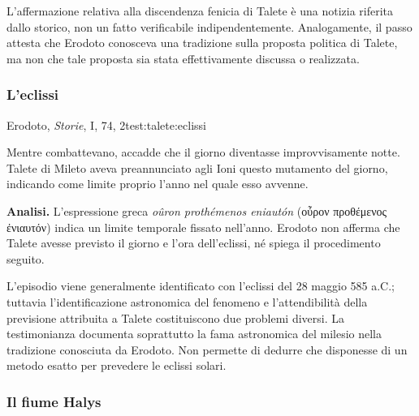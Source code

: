 L'affermazione relativa alla discendenza fenicia di Talete è una notizia riferita dallo storico, non un fatto verificabile indipendentemente. Analogamente, il passo attesta che Erodoto conosceva una tradizione sulla proposta politica di Talete, ma non che tale proposta sia stata effettivamente discussa o realizzata.

\subsubsection{L'eclissi}

\begin{testimonianza}{Erodoto, \emph{Storie}, I, 74, 2}{test:talete:eclissi}
\smallskip
{}\par
Mentre combattevano, accadde che il giorno diventasse improvvisamente notte. Talete di Mileto aveva preannunciato agli Ioni questo mutamento del giorno, indicando come limite proprio l'anno nel quale esso avvenne.
\end{testimonianza}



\noindent\textbf{Analisi.}
L'espressione greca \emph{oûron prothémenos eniautón} (οὖρον προθέμενος ἐνιαυτόν) indica un limite temporale fissato nell'anno. Erodoto non afferma che Talete avesse previsto il giorno e l'ora dell'eclissi, né spiega il procedimento seguito.

L'episodio viene generalmente identificato con l'eclissi del 28 maggio 585 a.C.; tuttavia l'identificazione astronomica del fenomeno e l'attendibilità della previsione attribuita a Talete costituiscono due problemi diversi. La testimonianza documenta soprattutto la fama astronomica del milesio nella tradizione conosciuta da Erodoto. Non permette di dedurre che disponesse di un metodo esatto per prevedere le eclissi solari.

\subsubsection{Il fiume Halys}

